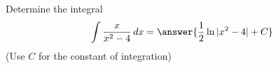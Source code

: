 \documentclass{ximera}
\author{Jason Miller}
\begin{document}
\begin{exercise}
Determine the integral
\[
\int \frac{x}{x^{2}-4} \d x=\answer{ \frac{1}{2} \ln|x^{2}-4|+ C}
\]
(Use $C$ for the constant of integration)

\end{exercise}
\end{document}
